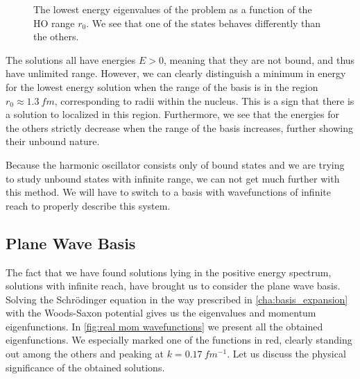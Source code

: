 \documentclass[../main/report.tex]{subfiles}
\begin{document}
\begin{figure}[ht!]
  \centering
  \caption{The lowest energy eigenvalues of the  problem as a function of the HO range $r_0$. We see that one of the states behaves differently than the others.}
  \label{fig:energies(r0)}
\end{figure}


The solutions all have energies $E>0$, meaning that they are not bound, and thus have unlimited range. 
However, we can clearly distinguish a minimum in energy for the lowest energy solution when the range of the basis is in the region $r_0 \approx \SI{1.3}{fm}$, corresponding to radii within the nucleus. 
This is a sign that there is a solution to  localized in this region. 
Furthermore, we see that the energies for the others strictly decrease when the range of the basis increases, further showing their unbound nature.

Because the harmonic oscillator consists only of bound states and we are trying to study unbound states with infinite range, we can not get much further with this method. 
We will have to switch to a basis with wavefunctions of infinite reach to properly describe this system.

\subsection{Plane Wave Basis}
The fact that we have found solutions lying in the positive energy spectrum, solutions with infinite reach, have brought us to consider the plane wave basis. 
Solving the Schrödinger equation in the way prescribed in \cref{cha:basis_expansion} with the Woods-Saxon potential gives us the eigenvalues and momentum eigenfunctions. 
In \cref{fig:real mom wavefunctions} we present all the obtained eigenfunctions. 
We especially marked one of the functions in red, clearly standing out among the others and peaking at $k = \SI{0.17}{fm^{-1}}$. 
Let us discuss the physical significance of the obtained solutions.
\end{document}
